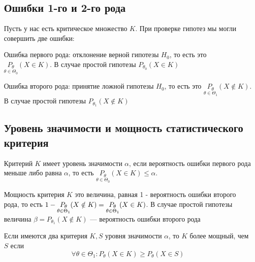 \subsection{Ошибки 1-го и 2-го рода}
Пусть у нас есть критическое множество $K$. При проверке гипотез мы могли совершить две ошибки:
\begin{definition*}
Ошибка первого рода: отклонение верной гипотезы $H_0$, то есть это $\underset{\theta\in\Theta_0}{P_\theta}(X\in K)$. В случае простой гипотезы $P_{\theta_0}(X\in K)$
\end{definition*}
\begin{definition*}
Ошибка второго рода: принятие ложной гипотезы $H_0$, то есть это $\underset{\theta\in\Theta_1}{P_\theta}(X\notin K)$. В случае простой гипотезы $P_{\theta_1}(X\notin K)$
\end{definition*}

\subsection{Уровень значимости и мощность статистического критерия}
\begin{definition*}
Критерий $K$ имеет уровень значимости $\alpha$, если вероятность ошибки первого рода меньше либо равна $\alpha$, то есть $\underset{\theta\in\Theta_0}{P_\theta}(X\in K)\leq\alpha$.
\end{definition*}

\begin{definition*}
Мощность критерия $K$ это величина, равная 1 - вероятность ошибки второго рода, то есть $\\ 1-\underset{\theta\in\Theta_1}{P_\theta}(X\notin K)=\underset{\theta\in\Theta_1}{P_\theta}(X\in K)$. В случае простой гипотезы величина $\beta=P_{\theta_1}(X\notin K)$ — вероятность ошибки второго рода
\end{definition*} 

Если имеются два критерия $K,S$ уровня значимости $\alpha$, то $K$ более мощный, чем $S$ если $$\forall\theta\in\Theta_1\colon P_\theta(X\in K)\geq P_\theta(X\in S)$$
